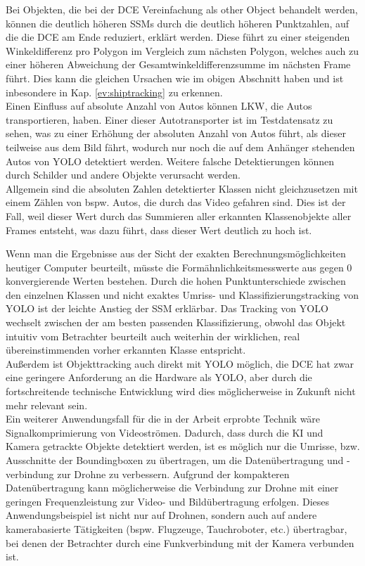 {{	Bei Objekten, die bei der DCE Vereinfachung als \glqq other Object\grqq{} behandelt werden, können die deutlich höheren SSMs durch die deutlich höheren Punktzahlen, auf die die DCE am Ende reduziert, erklärt werden. Diese führt zu einer steigenden Winkeldifferenz pro Polygon im Vergleich zum nächsten Polygon, welches auch zu einer höheren Abweichung der Gesamtwinkeldifferenzsumme im nächsten Frame führt. Dies kann die gleichen Ursachen wie im obigen Abschnitt haben und ist inbesondere in Kap. \ref{ev:shiptracking} zu erkennen. \\

	Einen Einfluss auf absolute Anzahl von Autos können LKW, die Autos transportieren, haben. Einer dieser Autotransporter ist im Testdatensatz zu sehen, was zu einer Erhöhung der absoluten Anzahl von Autos führt, als dieser teilweise aus dem Bild fährt, wodurch nur noch die auf dem Anhänger stehenden Autos von YOLO detektiert werden. Weitere falsche Detektierungen können durch Schilder und andere Objekte verursacht werden. \\
	Allgemein sind die absoluten Zahlen detektierter Klassen nicht gleichzusetzen mit einem Zählen von bspw. Autos, die durch das Video gefahren sind. Dies ist der Fall, weil dieser Wert durch das Summieren aller erkannten Klassenobjekte aller Frames entsteht, was dazu führt, dass dieser Wert deutlich zu hoch ist.

	Wenn man die Ergebnisse aus der Sicht der exakten Berechnungsmöglichkeiten heutiger Computer beurteilt, müsste die Formähnlichkeitsmesswerte aus gegen 0 konvergierende Werten bestehen. Durch die hohen Punktunterschiede zwischen den einzelnen Klassen und nicht exaktes Umriss- und Klassifizierungstracking von YOLO ist der leichte Anstieg der SSM erklärbar. Das Tracking von YOLO wechselt zwischen der am besten passenden Klassifizierung, obwohl das Objekt intuitiv vom Betrachter beurteilt auch weiterhin der wirklichen, real übereinstimmenden vorher erkannten Klasse entspricht. \\
	Außerdem ist Objekttracking auch direkt mit YOLO möglich, die DCE hat zwar eine geringere Anforderung an die Hardware als YOLO, aber durch die fortschreitende technische Entwicklung wird dies möglicherweise in Zukunft nicht mehr relevant sein. \\

	Ein weiterer Anwendungsfall für die in der Arbeit erprobte Technik wäre Signalkomprimierung von Videoströmen. Dadurch, dass durch die KI und Kamera getrackte Objekte detektiert werden, ist es möglich nur die Umrisse, bzw. Ausschnitte der Boundingboxen zu übertragen, um die Datenübertragung und -verbindung zur Drohne zu verbessern. Aufgrund der kompakteren Datenübertragung kann möglicherweise die Verbindung zur Drohne mit einer geringen Frequenzleistung zur Video- und Bildübertragung erfolgen. Dieses Anwendungsbeispiel ist nicht nur auf Drohnen, sondern auch auf andere kamerabasierte Tätigkeiten (bspw. Flugzeuge, Tauchroboter, etc.) übertragbar, bei denen der Betrachter durch eine Funkverbindung mit der Kamera verbunden ist.\\

}}
